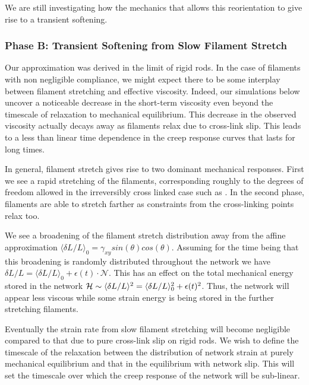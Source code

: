 \documentclass[pre,reprint]{revtex4-1}
\begin{document}
We are still investigating how the mechanics that allows this reorientation to give rise to a transient softening.

\subsubsection{Phase B: Transient Softening from Slow Filament Stretch}
\label{sec:compliant}

Our approximation was derived in the limit of rigid rods.  In the case of filaments with non negligible compliance, we might expect there to be some interplay between filament stretching and effective viscosity.  Indeed, our simulations below uncover a noticeable decrease in the short-term viscosity even beyond the timescale of relaxation to mechanical equilibrium.  This decrease in the observed viscosity actually decays away as filaments relax due to cross-link slip.  This leads to a less than linear time dependence in the creep response curves that lasts for long times.  

In general, filament stretch gives rise to two dominant mechanical responses.  First we see a rapid stretching of the filaments, corresponding roughly to the degrees of freedom allowed in the irreversibly cross linked case such as \cite{theo_hlm}.  In the second phase, filaments are able to stretch farther as constraints from the cross-linking points relax too.

We see a broadening of the filament stretch distribution away from the affine approximation $\langle \delta L/L\rangle_0 = \gamma_{xy}sin(\theta)cos(\theta)$.  Assuming for the time being that this broadening is randomly distributed throughout the network we have $\delta L/L = \langle \delta L/L\rangle_0 + \epsilon(t)\cdot\mathcal{N}$.  This has an effect on the total mechanical energy stored in the network ${\cal H} \sim  \langle\delta L/L\rangle^2 = \langle\delta L/L\rangle_0^2 +\epsilon(t)^2 $.  Thus, the network will appear less viscous while some strain energy is being stored in the further stretching filaments.  

Eventually the strain rate from slow filament stretching will become negligible compared to that due to pure cross-link slip on rigid rods.  We wish to define the timescale of the relaxation between the distribution of network strain at purely mechanical equilibrium and that in the equilibrium with network slip.  This will set the timescale over which the creep response of the network will be sub-linear.
\end{document}

